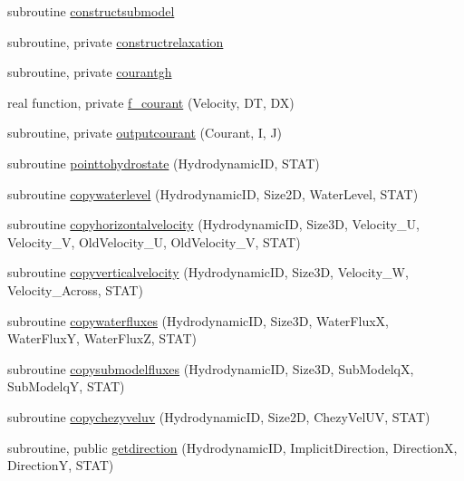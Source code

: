 \begin{DoxyCompactItemize}
\item 
subroutine \mbox{\hyperlink{namespacemodulehydrodynamic_a2892f053e17fe9b586d237a8b6684326}{constructsubmodel}}
\item 
subroutine, private \mbox{\hyperlink{namespacemodulehydrodynamic_ac37871a130f9232cb11f29fc34327f44}{constructrelaxation}}
\item 
subroutine, private \mbox{\hyperlink{namespacemodulehydrodynamic_a6effd02220d9411965b29d5f27b26d92}{courantgh}}
\item 
real function, private \mbox{\hyperlink{namespacemodulehydrodynamic_a752353d6a88048109cbe1a037fe56ef7}{f\+\_\+courant}} (Velocity, DT, DX)
\item 
subroutine, private \mbox{\hyperlink{namespacemodulehydrodynamic_afd382f82c852a1679b370aaa578e6ce2}{outputcourant}} (Courant, I, J)
\item 
subroutine \mbox{\hyperlink{namespacemodulehydrodynamic_a132ea2e90b030b8a52c174eec61093e2}{pointtohydrostate}} (Hydrodynamic\+ID, S\+T\+AT)
\item 
subroutine \mbox{\hyperlink{namespacemodulehydrodynamic_a6a39453a1be66896cddce62126fa7bcc}{copywaterlevel}} (Hydrodynamic\+ID, Size2D, Water\+Level, S\+T\+AT)
\item 
subroutine \mbox{\hyperlink{namespacemodulehydrodynamic_af9f7b027775cfbeb5d359cec2be0b0ad}{copyhorizontalvelocity}} (Hydrodynamic\+ID, Size3D, Velocity\+\_\+U, Velocity\+\_\+V, Old\+Velocity\+\_\+U, Old\+Velocity\+\_\+V, S\+T\+AT)
\item 
subroutine \mbox{\hyperlink{namespacemodulehydrodynamic_a8d99754e0f222c6f691a79e16a3b85b5}{copyverticalvelocity}} (Hydrodynamic\+ID, Size3D, Velocity\+\_\+W, Velocity\+\_\+\+Across, S\+T\+AT)
\item 
subroutine \mbox{\hyperlink{namespacemodulehydrodynamic_a389c77d3103d5944ec90680d613d2e56}{copywaterfluxes}} (Hydrodynamic\+ID, Size3D, Water\+FluxX, Water\+FluxY, Water\+FluxZ, S\+T\+AT)
\item 
subroutine \mbox{\hyperlink{namespacemodulehydrodynamic_a69bb56671a822946694acb66f9417d61}{copysubmodelfluxes}} (Hydrodynamic\+ID, Size3D, Sub\+ModelqX, Sub\+ModelqY, S\+T\+AT)
\item 
subroutine \mbox{\hyperlink{namespacemodulehydrodynamic_a7f81263a032159db07514b5cfba12a65}{copychezyveluv}} (Hydrodynamic\+ID, Size2D, Chezy\+Vel\+UV, S\+T\+AT)
\item 
subroutine, public \mbox{\hyperlink{namespacemodulehydrodynamic_aaf6054c97ad6e684bd893e075b4d0641}{getdirection}} (Hydrodynamic\+ID, Implicit\+Direction, DirectionX, DirectionY, S\+T\+AT)

\end{DoxyCompactItemize}
